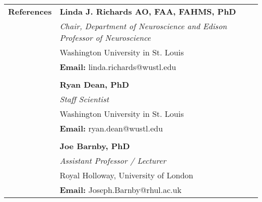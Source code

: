 \documentclass{article}
\begin{document}
\begin{longtable}{r | p{13cm}}
											\pagebreak

		\large\textbf{References} 	  		& \large\textbf{Linda J. Richards AO, FAA, FAHMS, PhD} \\
											& \textit{Chair, Department of Neuroscience and Edison Professor of Neuroscience} \\
											& Washington University in St. Louis \\
											& \textbf{Email:} linda.richards@wustl.edu \\
											& \\

											& \large\textbf{Ryan Dean, PhD} \\
											& \textit{Staff Scientist} \\
											& Washington University in St. Louis \\
											& \textbf{Email:} ryan.dean@wustl.edu \\
											& \\

											& \large\textbf{Joe Barnby, PhD} \\
											& \textit{Assistant Professor / Lecturer} \\
											& Royal Holloway, University of London \\
											& \textbf{Email:} Joseph.Barnby@rhul.ac.uk \\
	\end{longtable}
\end{document}
